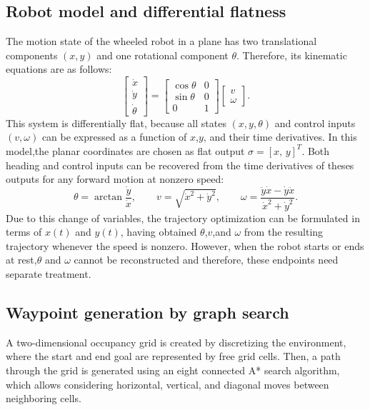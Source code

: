 \subsection{Robot model and differential flatness}
The motion state of the wheeled robot in a plane has two translational components $(x,y)$ and one rotational component \( \theta \). Therefore, its kinematic equations are as follows:
\begin{equation}
\begin{bmatrix}
    \dot{x} \\
    \dot{y} \\
    \dot{\theta}
\end{bmatrix}
=
\begin{bmatrix}
    \cos\theta & 0 \\
    \sin\theta & 0 \\
    0          & 1
\end{bmatrix}
\begin{bmatrix}
    v \\
    \omega
\end{bmatrix}.
\label{eq:robot_kinematics}
\end{equation}
This system is differentially flat, because all states $(x,y,\theta)$ and control inputs $(v,\omega)$ can be expressed as a function of $x$,$y$, and their time derivatives.
In this model,the planar coordinates are chosen as flat output $\sigma = [x,\,y]^T$.
Both heading and control inputs can be recovered from the time derivatives of theses outputs for any forward motion at nonzero speed:
\begin{equation}
\theta = \arctan\frac{\dot{y}}{\dot{x}}, \qquad
v = \sqrt{\dot{x}^2+\dot{y}^2}, \qquad
\omega = \frac{\ddot{y}\dot{x}-\dot{y}\ddot{x}}{\dot{x}^2+\dot{y}^2}.
\label{eq:flatness}
\end{equation}
Due to this change of variables, the trajectory optimization can be formulated in terms of $x(t)$ and $y(t)$, having obtained $\theta$,$v$,and $\omega$ from the resulting trajectory whenever the speed is nonzero. However, when the robot starts or ends at rest,$\theta$ and $\omega$ cannot be reconstructed and therefore, these endpoints need separate treatment.

\subsection{Waypoint generation by graph search}
A two-dimensional occupancy grid is created by discretizing the environment, where the start and end goal are represented by free grid cells. Then, a path through the grid is generated using an eight connected A* search algorithm, which allows considering horizontal, vertical, and diagonal moves between neighboring cells.

